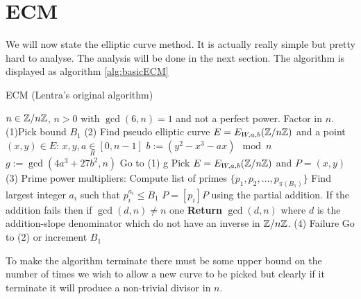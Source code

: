 \section{ECM}
\label{sec:ECM}
We will now state the elliptic curve method. It is actually really simple but pretty hard to analyse. The analysis will be done in the next section. The algorithm is displayed as algorithm \ref{alg:basicECM}
\begin{algorithm}
\caption{ECM (Lentra's original algorithm)}
\label{alg:basicECM}
\begin{algorithmic} 
\REQUIRE $n\in \mathbb{Z}/n\mathbb{Z}$, $n>0$ with $\gcd(6,n)=1$ and not a perfect power. 
\ENSURE Factor in $n$.
\STATE (1)Pick bound $B_1$
\STATE (2) Find pseudo elliptic curve $E=E_{W,a,b}(\mathbb{Z}/n\mathbb{Z})$ and a point $(x,y)\in E$:
\STATE $x,y,a\underset{R}{\in} [0,n-1]$
\STATE $b:=(y^2-x^3-ax)\mod n$
\STATE $g:=\gcd(4a^3+27b^2,n)$
\STATE Go to (1)
\ENDIF
{} 
\RETURN g
\ENDIF
\STATE Pick $E=E_{W,a,b}(\mathbb{Z}/n\mathbb{Z})$ and $P=(x,y)$
\STATE (3) Prime power multipliers:
\STATE Compute list of primes $\{p_1,p_2,\ldots,p_{\pi(B_1)}\}$
\STATE Find largest integer $a_i$ such that $p_i^{a_i}\leq B_1$ 
\STATE $P=[p_i]P$ using the partial addition. If the addition fails then if $\gcd(d,n)\neq n$ one \textbf{Return} $\gcd(d,n)$ where $d$ is the addition-slope denominator which do not have an inverse in $\mathbb{Z}/n\mathbb{Z}$.
\ENDFOR
\ENDFOR
\STATE (4) Failure
\STATE Go to (2) or increment $B_1$
\end{algorithmic}
\end{algorithm}

\begin{rem}\label{rem:ECMterminate}
To make the algorithm terminate there must be some upper bound on the number of times we wish to allow a new curve to be picked but clearly if it terminate it will produce a non-trivial divisor in $n$. 
\end{rem}

